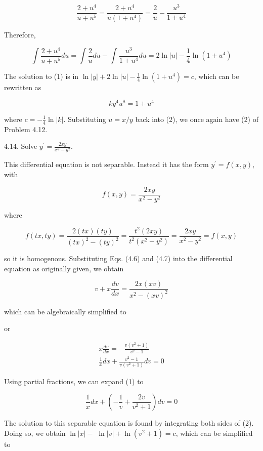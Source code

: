 \documentclass[10pt]{article}
\begin{document}
$$
\frac{2+u^{4}}{u+u^{5}}=\frac{2+u^{4}}{u\left(1+u^{4}\right)}=\frac{2}{u}-\frac{u^{3}}{1+u^{4}}
$$

Therefore,

$$
\int \frac{2+u^{4}}{u+u^{5}} d u=\int \frac{2}{u} d u-\int \frac{u^{3}}{1+u^{4}} d u=2 \ln |u|-\frac{1}{4} \ln \left(1+u^{4}\right)
$$

The solution to (1) is in $\ln |y|+2 \ln |u|-\frac{1}{4} \ln \left(1+u^{4}\right)=c$, which can be rewritten as


\begin{equation*}
k y^{4} u^{8}=1+u^{4} \tag{2}
\end{equation*}


where $c=-\frac{1}{4} \ln |k|$. Substituting $u=x / y$ back into (2), we once again have (2) of Problem 4.12.

4.14. Solve $y^{\prime}=\frac{2 x y}{x^{2}-y^{2}}$.

This differential equation is not separable. Instead it has the form $y^{\prime}=f(x, y)$, with

$$
f(x, y)=\frac{2 x y}{x^{2}-y^{2}}
$$

where

$$
f(t x, t y)=\frac{2(t x)(t y)}{(t x)^{2}-(t y)^{2}}=\frac{t^{2}(2 x y)}{t^{2}\left(x^{2}-y^{2}\right)}=\frac{2 x y}{x^{2}-y^{2}}=f(x, y)
$$

so it is homogenous. Substituting Eqs. (4.6) and (4.7) into the differential equation as originally given, we obtain

$$
v+x \frac{d v}{d x}=\frac{2 x(x v)}{x^{2}-(x v)^{2}}
$$

which can be algebraically simplified to

or


\begin{gather*}
x \frac{d v}{d x}=-\frac{v\left(v^{2}+1\right)}{v^{2}-1} \\
\frac{1}{x} d x+\frac{v^{2}-1}{v\left(v^{2}+1\right)} d v=0 \tag{1}
\end{gather*}


Using partial fractions, we can expand (1) to


\begin{equation*}
\frac{1}{x} d x+\left(-\frac{1}{v}+\frac{2 v}{v^{2}+1}\right) d v=0 \tag{2}
\end{equation*}


The solution to this separable equation is found by integrating both sides of (2). Doing so, we obtain $\ln |x|-$ $\ln |v|+\ln \left(v^{2}+1\right)=c$, which can be simplified to
\end{document}
